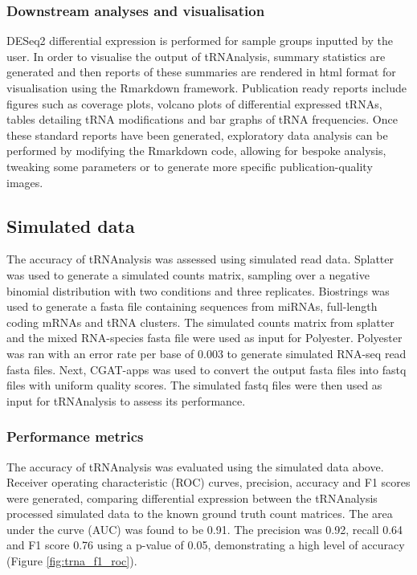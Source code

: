 \subsubsection{Downstream analyses and visualisation}
DESeq2 differential expression is performed for sample groups inputted by the user.
In order to visualise the output of tRNAnalysis, summary statistics are generated and then reports of these summaries are rendered in html format for visualisation using the Rmarkdown framework.
Publication ready reports include figures such as coverage plots, volcano plots of differential expressed tRNAs, tables detailing tRNA modifications and bar graphs of tRNA frequencies.
Once these standard reports have been generated, exploratory data analysis can be performed by modifying the Rmarkdown code, allowing for bespoke analysis, tweaking some parameters or to generate more specific publication-quality images.

\subsection{Simulated data}
The accuracy of tRNAnalysis was assessed using simulated read data.
Splatter\cite{zappia2017splatter} was used to generate a simulated counts matrix, sampling over a negative binomial distribution with two conditions and three replicates.
Biostrings\cite{pages2013package} was used to generate a fasta file containing sequences from miRNAs, full-length coding mRNAs and tRNA clusters.
The simulated counts matrix from splatter and the mixed RNA-species fasta file were used as input for Polyester\cite{frazee2015polyester}.
Polyester was ran with an error rate per base of 0.003 to generate simulated RNA-seq read fasta files.
Next, CGAT-apps\cite{sims2014cgat} was used to convert the output fasta files into fastq files with uniform quality scores.
The simulated fastq files were then used as input for tRNAnalysis to assess its performance.

\subsubsection{Performance metrics}
The accuracy of tRNAnalysis was evaluated using the simulated data above.
Receiver operating characteristic (ROC) curves, precision, accuracy and F1 scores were generated, comparing differential expression between the tRNAnalysis processed simulated data to the known ground truth count matrices.
The area under the curve (AUC) was found to be 0.91.
The precision was 0.92, recall 0.64 and F1 score 0.76 using a p-value of 0.05, demonstrating a high level of accuracy (Figure \ref{fig:trna_f1_roc}).

